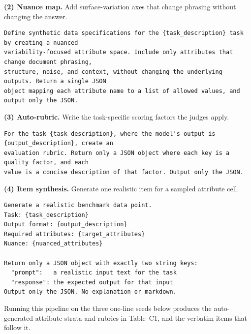 \textbf{(2) Nuance map.} Add surface-variation axes that change phrasing without changing the answer.

\begin{Verbatim}[breaklines=true,breakanywhere=true,fontsize=\small]
Define synthetic data specifications for the {task_description} task by creating a nuanced
variability-focused attribute space. Include only attributes that change document phrasing,
structure, noise, and context, without changing the underlying outputs. Return a single JSON
object mapping each attribute name to a list of allowed values, and output only the JSON.
\end{Verbatim}


\textbf{(3) Auto-rubric.} Write the task-specific scoring factors the judges apply.

\begin{Verbatim}[breaklines=true,breakanywhere=true,fontsize=\small]
For the task {task_description}, where the model's output is {output_description}, create an
evaluation rubric. Return only a JSON object where each key is a quality factor, and each
value is a concise description of that factor. Output only the JSON.
\end{Verbatim}


\textbf{(4) Item synthesis.} Generate one realistic item for a sampled attribute cell.

\begin{Verbatim}[breaklines=true,breakanywhere=true,fontsize=\small]
Generate a realistic benchmark data point.
Task: {task_description}
Output format: {output_description}
Required attributes: {target_attributes}
Nuance: {nuanced_attributes}

Return only a JSON object with exactly two string keys:
  "prompt":   a realistic input text for the task
  "response": the expected output for that input
Output only the JSON. No explanation or markdown.
\end{Verbatim}


Running this pipeline on the three one-line seeds below produces the auto-generated attribute strata and rubrics in
Table~C1, and the verbatim items that follow it.

